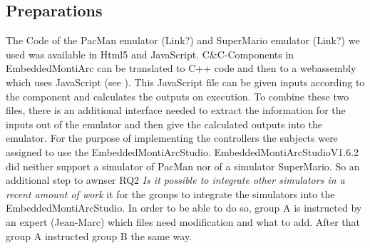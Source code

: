 \subsection{Preparations}
The Code of the PacMan emulator (Link?) and SuperMario emulator (Link?) we used was available in Html5 and JavaScript. C\&C-Components in EmbeddedMontiArc can be translated to C++ code and then to a webassembly which uses JavaScript (see \cite{bertram2017component}). This JavaScript file can be given inputs according to the component and calculates the outputs on execution. To combine these two files, there is an additional interface needed to extract the information for the inputs out of the emulator and then give the calculated outputs into the emulator.
For the purpose of implementing the controllers the subjects were assigned to use the EmbeddedMontiArcStudio.
EmbeddedMontiArcStudioV1.6.2 did neither support a simulator of PacMan nor of a simulator SuperMario. So an additional step to awnser RQ2 \textit{Is it possible to integrate other simulators in a recent amount of work} it for the groups to integrate the simulators into the EmbeddedMontiArcStudio.
In order to be able to do so, group A is instructed by an expert (Jean-Marc) which files need modification and what to add. After that group A instructed group B the same way.

